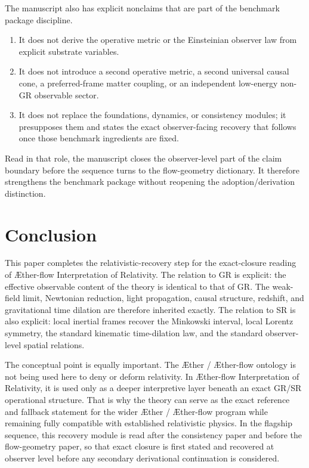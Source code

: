 \documentclass[11pt]{article}
\newcommand{\Aether}{\AE{}ther}
\newcommand{\Aflow}{\AE{}ther-flow}
\newcommand{\TheoryName}{\Aflow{} Interpretation of Relativity}
\begin{document}
The manuscript also has explicit nonclaims that are part of the benchmark package discipline.
\begin{enumerate}
    \item It does not derive the operative metric or the Einsteinian observer law from explicit substrate variables.
    \item It does not introduce a second operative metric, a second universal causal cone, a preferred-frame matter coupling, or an independent low-energy non-GR observable sector.
    \item It does not replace the foundations, dynamics, or consistency modules; it presupposes them and states the exact observer-facing recovery that follows once those benchmark ingredients are fixed.
\end{enumerate}

Read in that role, the manuscript closes the observer-level part of the claim boundary before the sequence turns to the flow-geometry dictionary. It therefore strengthens the benchmark package without reopening the adoption/derivation distinction.

\section{Conclusion}

This paper completes the relativistic-recovery step for the exact-closure reading of \TheoryName{}. The relation to GR is explicit: the effective observable content of the theory is identical to that of GR. The weak-field limit, Newtonian reduction, light propagation, causal structure, redshift, and gravitational time dilation are therefore inherited exactly. The relation to SR is also explicit: local inertial frames recover the Minkowski interval, local Lorentz symmetry, the standard kinematic time-dilation law, and the standard observer-level spatial relations.

The conceptual point is equally important. The \Aether{} / \Aflow{} ontology is not being used here to deny or deform relativity. In \TheoryName{}, it is used only as a deeper interpretive layer beneath an exact GR/SR operational structure. That is why the theory can serve as the exact reference and fallback statement for the wider \Aether{} / \Aflow{} program while remaining fully compatible with established relativistic physics. In the flagship sequence, this recovery module is read after the consistency paper and before the flow-geometry paper, so that exact closure is first stated and recovered at observer level before any secondary derivational continuation is considered.
\end{document}
